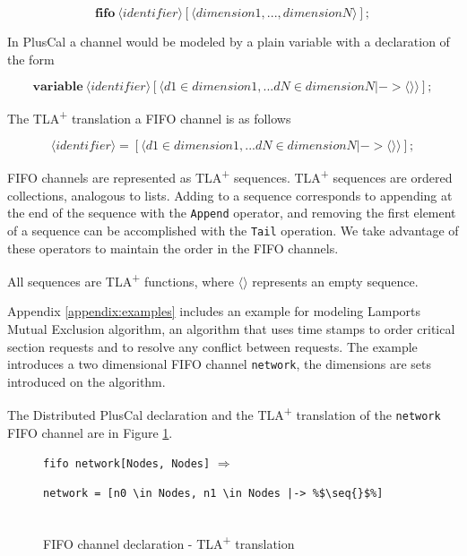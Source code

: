 \documentclass{thesul}
\newcommand{\tlaplus}{TLA\textsuperscript{+}\xspace}
\newcommand{\seq}[1]{\langle #1 \rangle}
\newcommand{\keyword}[1]{\textbf{#1}}
\newcommand{\entity}[1]{\ensuremath{\langle}#1\ensuremath{\rangle}}
\begin{document}
\[
 \keyword{fifo}\ \entity{identifier}[\entity{dimension1,...,dimensionN}];
\]

In PlusCal a channel would be modeled by a plain variable with a declaration of the form

\[
 \keyword{variable}\ \entity{identifier}[\entity{d1 \in dimension1,... dN \in dimensionN |-> \seq{}}];
\]

The \tlaplus translation a FIFO channel is as follows

\[
 \entity{identifier} = [\entity{d1 \in dimension1,... dN \in dimensionN |-> \seq{}}];
\]


FIFO channels are represented as \tlaplus sequences.
\tlaplus sequences are ordered collections, analogous to lists. Adding to a sequence corresponds to appending at the end of the sequence with the \verb|Append| operator, and removing the first element of a sequence can be accomplished with the \verb|Tail| operation. We take advantage of these operators to maintain the order in the FIFO channels.

All sequences are \tlaplus functions, where $\seq{}$ represents an empty sequence.

Appendix \ref{appendix:examples} includes an example for  modeling Lamports Mutual Exclusion algorithm, an algorithm that uses time stamps to order critical section requests and to resolve any conflict between requests. The example introduces a two dimensional FIFO channel \verb|network|, the dimensions are sets introduced on the algorithm.

The Distributed PlusCal declaration and the \tlaplus translation of the \verb|network| FIFO channel are in Figure \ref{fifochannels}.
 

\FloatBarrier
\begin{figure}[!h]
\begin{minipage}{.3\textwidth}

\lstinline|fifo network[Nodes, Nodes]| $\Rightarrow$ 
\end{minipage}\hfill
\begin{minipage}{.7\textwidth}
\begin{lstlisting}[escapechar=\%, frame = none, numbers = none]
network = [n0 \in Nodes, n1 \in Nodes |-> %$\seq{}$%]
  
\end{lstlisting}  
\end{minipage}\hfill
\caption{FIFO channel declaration - \tlaplus translation}
\label{fifochannels}
\end{figure}
\FloatBarrier
\end{document}
